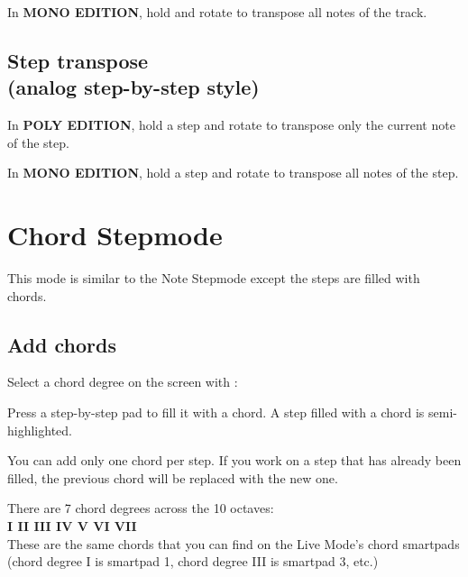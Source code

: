 In \textbf{MONO EDITION}, hold  and rotate \encodericon{} to transpose all notes of the track.


\subsection[Step transpose]{Step transpose\\(analog step-by-step style)}

In \textbf{POLY EDITION}, hold a step \stepbystepicon{} and rotate \encodericon{} to transpose only the current note of the step.


In \textbf{MONO EDITION}, hold a step \stepbystepicon{} and rotate \encodericon{} to transpose all notes of the step.




\section{Chord Stepmode}

This mode is similar to the Note Stepmode except the steps are filled with chords.

\subsection{Add chords}

Select a chord degree on the screen with \encodericon{}:



Press a step-by-step pad \stepbystepicon{} to fill it with a chord. A step filled with a chord is semi-highlighted.


You can add only one chord per step. If you work on a step that has already been filled, the previous chord will be replaced with the new one.

There are 7 chord degrees across the 10 octaves:\\
\textbf{I  II  III  IV  V  VI  VII}\\
These are the same chords that you can find on the Live Mode's chord smartpads (chord degree I is smartpad 1, chord degree III is smartpad 3, etc.)

